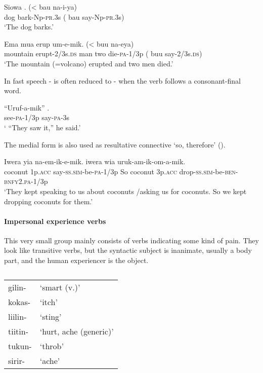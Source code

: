 \ea%
\label{ex:x331}
\gll Siowa . ({{\textless}} bau na-i-ya) \\
dog bark-Np-\textsc{pr}.3s ( bau say-Np-\textsc{pr}.3s)\\
\glt`The dog barks.'
\z

\ea%
\label{ex:x332}
\gll Ema  mua erup um-e-mik. ({{\textless}} buu na-eya) \\
mountain erupt-2/3s.\textsc{ds} man two die-\textsc{pa}-1/3p ( buu say-2/3s.\textsc{ds})\\
\glt`The mountain (=volcano) erupted and two men died.'
\z

In fast speech - is often reduced to - when the verb follows a consonant-final word.

\ea%
\label{ex:x333}
\gll ``Uruf-a-mik'' . \\
see-\textsc{pa}-1/3p say-\textsc{pa}-3s \\
\glt` ``They saw it,'' he said.'
\z

The medial form  is also used as resultative connective `so, therefore' ().

\ea%
\label{ex:x500}
\gll Iwera yia na-em-ik-e-mik.  iwera wia uruk-am-ik-om-a-mik. \\
coconut 1p.\textsc{acc} say-\textsc{ss}.\textsc{sim}-be-\textsc{pa}-1/3p So coconut 3p.\textsc{acc} drop-\textsc{ss}.\textsc{sim}-be-\textsc{ben}-\textsc{bnfy}2.\textsc{pa}-1/3p\\
\glt`They kept speaking to us about coconuts /asking us for coconuts. So we kept dropping coconuts for them.'
\z

\paragraph[Impersonal experience verbs]{Impersonal experience verbs}
{}
This very small group mainly consists of verbs indicating some kind of pain. They look like transitive verbs, but the syntactic subject is inanimate, usually a body part, and the human experiencer is the object. 

\begin{table}
\caption{}
\label{} 
\begin{tabular}{ll}
gilin- &`smart (v.)'\\
kokas- &`itch'\\
liilin- &`sting'\\
tiitin- &`hurt, ache (generic)'\\
tukun- &`throb'\\
sirir- &`ache'\\
\end{tabular}

\end{table}

